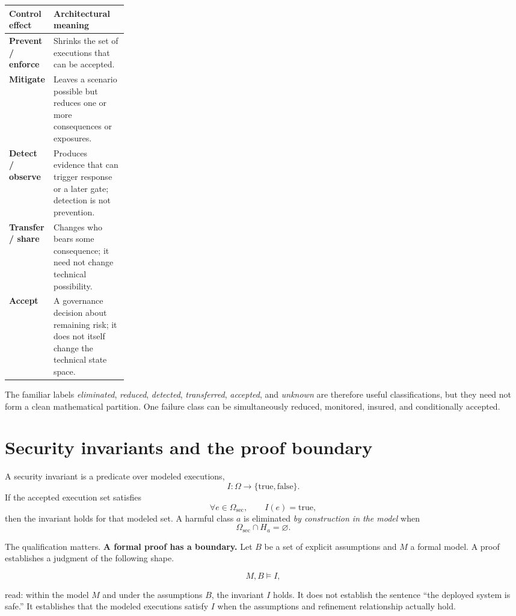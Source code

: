 \documentclass[10pt,oneside,openany]{book}
\begin{document}
\begin{center}
\small
\begin{tabularx}{0.95\linewidth}{>{\bfseries}p{0.23\linewidth} Y}
\toprule
Control effect & Architectural meaning \\
\midrule
Prevent / enforce & Shrinks the set of executions that can be accepted. \\
Mitigate & Leaves a scenario possible but reduces one or more consequences or exposures. \\
Detect / observe & Produces evidence that can trigger response or a later gate; detection is not prevention. \\
Transfer / share & Changes who bears some consequence; it need not change technical possibility. \\
Accept & A governance decision about remaining risk; it does not itself change the technical state space. \\
\bottomrule
\end{tabularx}
\end{center}

The familiar labels \emph{eliminated}, \emph{reduced}, \emph{detected}, \emph{transferred}, \emph{accepted}, and \emph{unknown} are therefore useful classifications, but they need not form a clean mathematical partition. One failure class can be simultaneously reduced, monitored, insured, and conditionally accepted.

\section{Security invariants and the proof boundary}

A security invariant is a predicate over modeled executions,
\[
I:\Omega\rightarrow\{\mathrm{true},\mathrm{false}\}.
\]
If the accepted execution set satisfies
\[
\forall e\in\Omega_{\mathrm{sec}},\qquad I(e)=\mathrm{true},
\]
then the invariant holds for that modeled set. A harmful class $a$ is eliminated \emph{by construction in the model} when
\[
\Omega_{\mathrm{sec}}\cap H_a=\varnothing.
\]

The qualification matters. \textbf{A formal proof has a boundary.} Let $B$ be a set of explicit assumptions and $M$ a formal model. A proof establishes a judgment of the following shape.
\begin{formulabox}
\[
M, B \models I,
\]
\end{formulabox}
read: within the model $M$ and under the assumptions $B$, the invariant $I$ holds. It does not establish the sentence ``the deployed system is safe.'' It establishes that the modeled executions satisfy $I$ when the assumptions and refinement relationship actually hold.
\end{document}
